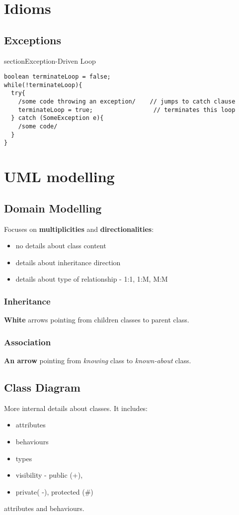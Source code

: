 \documentclass{report}
\begin{document}
\part{Idioms}

\chapter{Exceptions}
section{Exception-Driven Loop}
\begin{verbatim}
boolean terminateLoop = false;
while(!terminateLoop){
  try{
    /some code throwing an exception/    // jumps to catch clause
    terminateLoop = true;                 // terminates this loop
  } catch (SomeException e){
    /some code/
  }
}
\end{verbatim}



\part{UML modelling}

\chapter{Domain Modelling}
Focuses on \textbf{multiplicities} and \textbf{directionalities}:
\begin{itemize}
	\item no details about class content
	\item details about inheritance direction
	\item details about type of relationship - 1:1, 1:M, M:M
\end{itemize}

\section{Inheritance}
\textbf{White} arrows pointing from children classes to parent class.

\section{Association}
\textbf{An arrow} pointing from \textit{knowing} class to \textit{known-about} class.

\chapter{Class Diagram}
More internal details about  classes. It includes:
\begin{itemize}
	\item attributes
	\item behaviours
	\item types
	\item visibility -  public (+),
	\item private( -), protected (\#)
\end{itemize} attributes and behaviours.
\end{document}
